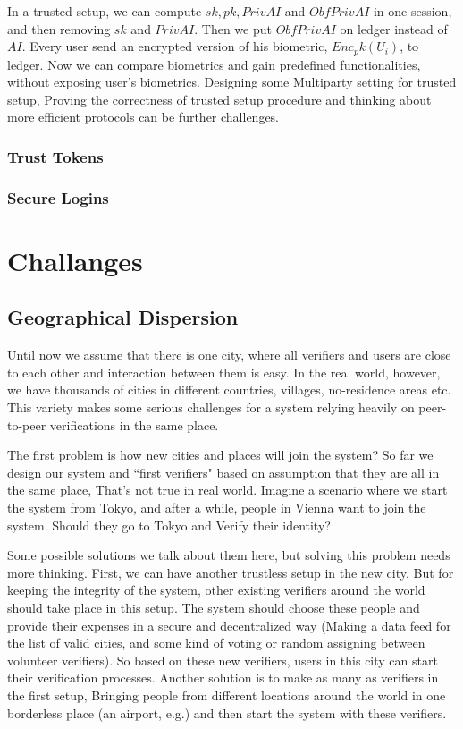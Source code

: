 \documentclass[conference]{IEEEtran}
\begin{document}
In a trusted setup, we can compute $sk,pk,PrivAI$ and $ObfPrivAI$ in one session, and then removing $sk$ and $PrivAI$. Then we put $ObfPrivAI$ on ledger instead of $AI$. Every user send an encrypted version of his biometric, $Enc_pk(U_i)$, to ledger. Now we can compare biometrics and gain predefined functionalities, without exposing user's biometrics. Designing some Multiparty setting for trusted setup, Proving the correctness of trusted setup procedure and thinking about more efficient protocols can be further challenges. 
\subsubsection*{Trust Tokens}
\subsubsection*{Secure Logins}

\section{Challanges }


\subsection{Geographical Dispersion}
Until now we assume that there is one city, where all verifiers and users are close to each other and interaction between them is easy. In the real world, however, we have thousands of cities in different countries, villages, no-residence areas etc. This variety makes some serious challenges for a system relying heavily on peer-to-peer verifications in the same place.


The first problem is how new cities and places will join the system? So far we design our system and ``first verifiers" based on assumption that they are all in the same place, That's not true in real world. Imagine a scenario where we start the system from Tokyo, and after a while, people in Vienna want to join the system. Should they go to Tokyo and Verify their identity?


Some possible solutions we talk about them here, but solving this problem needs more thinking. First, we can have another trustless setup in the new city. But for keeping the integrity of the system, other existing verifiers around the world should take place in this setup. The system should choose these people and provide their expenses in a secure and decentralized way (Making a data feed for the list of valid cities, and some kind of voting or random assigning between volunteer verifiers). So based on these new verifiers, users in this city can start their verification processes. Another solution is to make as many as verifiers in the first setup, Bringing people from different locations around the world in one borderless place (an airport, e.g.) and then start the system with these verifiers. 
\end{document}
